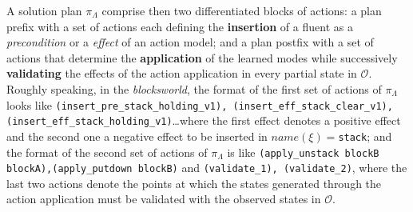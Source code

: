 \documentclass[runningheads]{llncs}
\begin{document}
A solution plan $\pi_\Lambda$ comprise then two differentiated blocks of actions: a plan prefix with a set of actions each defining the \textbf{insertion} of a fluent as a {\em precondition} or a {\em effect} of an action model; and a plan postfix with a set of actions that determine the \textbf{application} of the learned modes while successively \textbf{validating} the effects of the action application in every partial state in ${\mathcal O}$. Roughly speaking, in the \emph{blocksworld}, the format of the first set of actions of $\pi_\Lambda$ looks like {\tt{\small (insert\_pre\_stack\_holding\_v1)}, {\tt\small (insert\_eff\_stack\_clear\_v1)}, {\tt\small (insert\_eff\_stack\_holding\_v1)}}\ldots where the first effect denotes a positive effect and the second one a negative effect to be inserted in $name(\xi)=${\tt{\small stack}}; and the format of the second set of actions of $\pi_\Lambda$ is like {\tt{\small (apply\_unstack blockB blockA),(apply\_putdown blockB)}} and {\tt{\small (validate\_1)}, {\tt\small (validate\_2)}}, where the last two actions denote the points at which the states generated through the action application must be validated with the observed states in ${\mathcal O}$.
\end{document}
